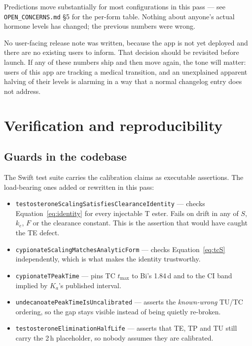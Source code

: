 \documentclass[11pt,a4paper]{article}
\newcommand{\code}[1]{\texttt{\small #1}}
\begin{document}
Predictions move substantially for most configurations in this pass --- see
\code{OPEN\_CONCERNS.md} \S5 for the per-form table. Nothing about anyone's actual
hormone levels has changed; the previous numbers were wrong.

No user-facing release note was written, because the app is not yet deployed and
there are no existing users to inform. That decision should be revisited before
launch. If any of these numbers ship and then move again, the tone will matter:
users of this app are tracking a medical transition, and an unexplained apparent
halving of their levels is alarming in a way that a normal changelog entry does
not address.

\section{Verification and reproducibility}

\subsection{Guards in the codebase}

The Swift test suite carries the calibration claims as executable assertions.
The load-bearing ones added or rewritten in this pass:

\begin{itemize}[nosep,leftmargin=1.4em]
\item \code{testosteroneScalingSatisfiesClearanceIdentity} --- checks
      Equation~\ref{eq:identity} for every injectable T ester. Fails on drift in
      any of $S$, $k_e$, $F$ or the clearance constant. This is the assertion that
      would have caught the TE defect.
\item \code{cypionateScalingMatchesAnalyticForm} --- checks
      Equation~\ref{eq:tcS} independently, which is what makes the identity
      trustworthy.
\item \code{cypionateTPeakTime} --- pins TC $t_{\max}$ to Bi's 1.84\,d and to the
      CI band implied by $K_a$'s published interval.
\item \code{undecanoatePeakTimeIsUncalibrated} --- asserts the \emph{known-wrong}
      TU/TC ordering, so the gap stays visible instead of being quietly
      re-broken.
\item \code{testosteroneEliminationHalfLife} --- asserts that TE, TP and TU still
      carry the 2\,h placeholder, so nobody assumes they are calibrated.
\end{itemize}
\end{document}
